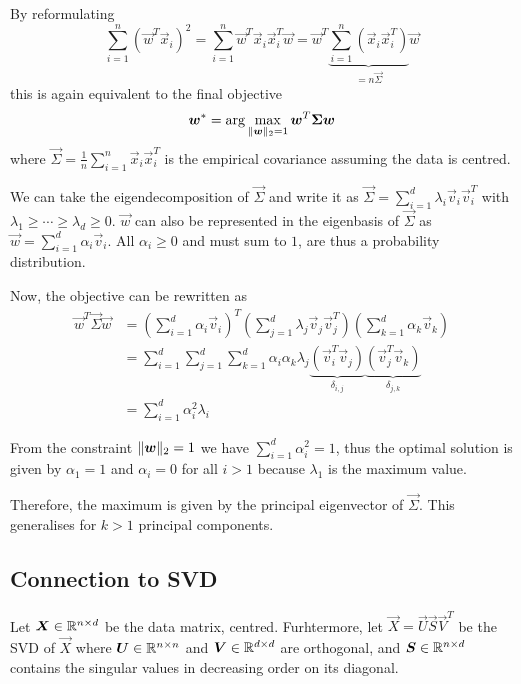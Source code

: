By reformulating
\begin{equation*}
    \sum_{i=1}^n{(\vec{w}^T \vec{x}_i)^2}
    = \sum_{i=1}^n{\vec{w}^T \vec{x}_i \vec{x}_i^T \vec{w}}
    = \vec{w}^T \underbrace{\sum_{i=1}^n{(\vec{x}_i \vec{x}_i^T)}}_{= n \vec{\Sigma}} \vec{w}
\end{equation*}
this is again equivalent to the final objective
\begin{equation*}
    \boldsymbol{w}^* = \arg\max_{\lVert\boldsymbol{w}\rVert_2 = 1}{
        \boldsymbol{w}^T \boldsymbol{\Sigma} \boldsymbol{w}
    }
\end{equation*}
where $\vec{\Sigma} = \frac{1}{n} \sum_{i=1}^n{\vec{x}_i \vec{x}_i^T}$ is the empirical covariance assuming the
data is centred.

We can take the eigendecomposition of $\vec{\Sigma}$ and
write it as
$\vec{\Sigma} = \sum_{i=1}^d{\lambda_i \vec{v}_i \vec{v}_i^T}$
with $\lambda_1 \geq \dotsb \geq \lambda_d \geq 0$.
$\vec{w}$ can also be represented in the eigenbasis
of $\vec{\Sigma}$ as
$\vec{w} = \sum_{i=1}^d{\alpha_i \vec{v}_i}$.
All $\alpha_i \geq 0$ and must sum to $1$,
are thus a probability distribution.

Now, the objective can be rewritten as
\begin{align*}
    \vec{w}^T \vec{\Sigma} \vec{w}
    &= \left(
        \sum_{i=1}^d{\alpha_i \vec{v}_i}
    \right)^T \left(
        \sum_{j=1}^d{\lambda_j \vec{v}_j \vec{v}_j^T}
    \right) \left(
        \sum_{k=1}^d{\alpha_k \vec{v}_k}
    \right) \\
    &= \sum_{i=1}^d{\sum_{j=1}^d{\sum_{k=1}^d{
        \alpha_i \alpha_k \lambda_j
        \underbrace{(\vec{v}_i^T \vec{v}_j)}_{\delta_{i,j}}
        \underbrace{(\vec{v}_j^T \vec{v}_k)}_{\delta_{j,k}}
    }}} \\
    &= \sum_{i=1}^d{\alpha_i^2 \lambda_i}
\end{align*}

From the constraint $\lVert\boldsymbol{w}\rVert_2 = 1$ we have
$\sum_{i=1}^d{\alpha_i^2} = 1$,
thus the optimal solution is given by
$\alpha_1 = 1$ and $\alpha_i = 0$ for all $i > 1$
because $\lambda_1$ is the maximum value.

Therefore, the maximum is given by the principal eigenvector
of $\vec{\Sigma}$.
This generalises for $k > 1$ principal components.


\subsection{Connection to SVD}
Let $\boldsymbol{X} \in \mathbb{R}^{n \times d}$ be the data matrix,
centred.
Furhtermore, let $\vec{X} = \vec{U} \vec{S} \vec{V}^T$ be
the SVD of $\vec{X}$ where $\boldsymbol{U} \in \mathbb{R}^{n \times n}$
and $\boldsymbol{V} \in \mathbb{R}^{d \times d}$ are orthogonal,
and $\boldsymbol{S} \in \mathbb{R}^{n \times d}$ contains the singular
values in decreasing order on its diagonal.

